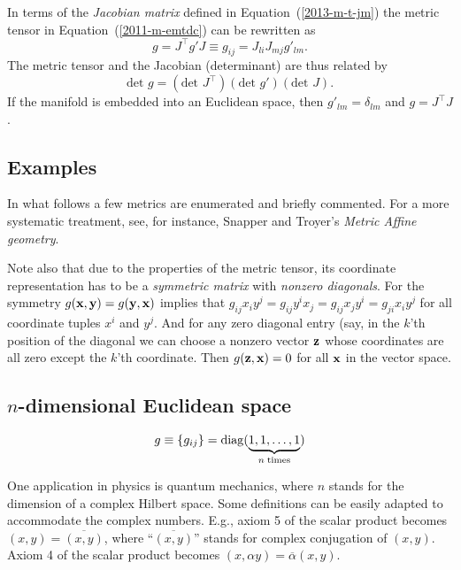 In terms of the
{\em  Jacobian matrix} defined in Equation~(\ref{2013-m-t-jm})
the metric tensor in Equation~(\ref{2011-m-emtdc})
can be rewritten as
\begin{equation}
g = J^\intercal  g' J
\equiv g_{ij}= J_{li}J_{mj}g'_{lm}
.
\label{2011-m-emtdcJ}
\end{equation}
The metric tensor and the Jacobian (determinant)
are thus related by
\begin{equation}
\textrm{det }g = (\textrm{det }J^\intercal ) (\textrm{det } g')(\textrm{det } J)
.
\label{2011-m-emtdcJd}
\end{equation}
If the manifold is embedded into an Euclidean space,
then $g'_{lm}=\delta_{lm}$
and  $g = J^\intercal   J $.

\subsection{Examples}

In what follows a few metrics are enumerated and briefly commented.
For a more systematic treatment, see, for instance, Snapper and Troyer's {\em Metric Affine geometry}.\cite{snapper-troyer}

Note also that due to the properties of the metric tensor, its coordinate representation has to be a {\em symmetric matrix}
with {\em nonzero diagonals}.
For the symmetry $g( {\bf x}  ,{\bf y} )=g({\bf y} ,{\bf x} )$ implies that $g_{ij}x_iy^j= g_{ij}y^ix_j=  g_{ij}x_jy^i= g_{ji}x_iy^j$ for all coordinate tuples
$x^i$ and $y^j$. And for any zero diagonal entry (say, in the $k$'th position of the diagonal we can choose a nonzero vector  ${\bf z}$
whose coordinates are all zero except the $k$'th coordinate. Then $g ({\bf z},{\bf x})=0$ for all ${\bf x}$ in the vector space.


\subsection*{$n$-dimensional Euclidean space}

\begin{equation}
g\equiv \{g_{ij}\}={\rm diag} (\underbrace{1,1,\ldots ,1}_{n\; {\rm times}})
\end{equation}

One application in physics is quantum mechanics,
where $n$ stands for the dimension of a complex Hilbert space.
Some definitions can be easily adapted to accommodate the complex numbers.
E.g., axiom 5 of the scalar product becomes
$(x,y)=\overline{(x,y)}$, where ``$\overline{(x,y)}$'' stands for complex conjugation of $(x,y)$.
Axiom 4 of the scalar product becomes
$(x,\alpha y)=\overline{\alpha} (x,y)$.

